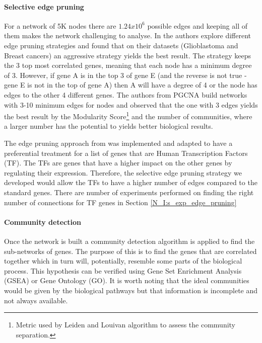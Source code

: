 \paragraph{Selective edge pruning}
For a network of 5K nodes there are $1.24x10^6$ possible edges and keeping all of them makes the network challenging to analyse. In \citet{Care2019-ij} the authors explore different edge pruning strategies and found that on their datasets (Glioblastoma and Breast cancers) an aggressive strategy yields the best result. The strategy keeps the 3 top most correlated genes, meaning that each node has a minimum degree of 3. However, if gene A is in the top 3 of gene E (and the reverse is not true - gene E is not in the top of gene A) then A will have a degree of 4 or the node has edges to the other 4 different genes. The authors from PGCNA build networks with 3-10 minimum edges for nodes and observed that the one with 3 edges yields the best result by the Modularity Score\footnote{Metric used by Leiden and Louivan algorithm to assess the community separation.} and the number of communities, where a larger number has the potential to yields better biological results.

The edge pruning approach from \citet{Care2019-ij} was implemented and adapted to have a preferential treatment for a list of genes that are Human Transcription Factors \cite{Lambert2018-el} (TF). The TFs are genes that have a higher impact on the other genes by regulating their expression. Therefore, the selective edge pruning strategy we developed would allow the TFs to have a higher number of edges compared to the standard genes. There are number of experiments performed on finding the right number of connections for TF genes in Section \ref{N_I:s_exp_edge_pruning}

\paragraph{Community detection}

Once the network is built a community detection algorithm is applied to find the sub-networks of genes. The purpose of this is to find the genes that are correlated together which in turn will, potentially, resemble some parts of the biological process. This hypothesis can be verified using Gene Set Enrichment Analysis (GSEA) or Gene Ontology (GO). It is worth noting that the ideal communities would be given by the biological pathways but that information is incomplete and not always available.

